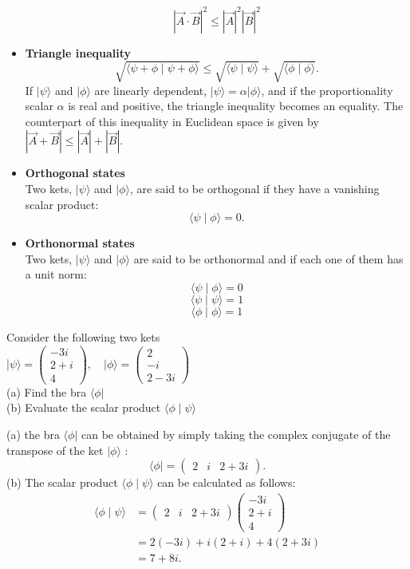 \begin{itemize}
$$
|\vec{A} \cdot \vec{B}|^{2} \leq|\vec{A}|^{2}|\vec{B}|^{2}
$$
\item \textbf{Triangle inequality}\\
$$
\sqrt{\langle\psi+\phi \mid \psi+\phi\rangle} \leq \sqrt{\langle\psi \mid \psi\rangle}+\sqrt{\langle\phi \mid \phi\rangle} .
$$
If $|\psi\rangle$ and $|\phi\rangle$ are linearly dependent, $|\psi\rangle=\alpha|\phi\rangle$, and if the proportionality scalar $\alpha$ is real and positive, the triangle inequality becomes an equality. The counterpart of this inequality in Euclidean space is given by $|\vec{A}+\vec{B}| \leq|\vec{A}|+|\vec{B}|$.
\item \textbf{Orthogonal states}\\
Two kets, $|\psi\rangle$ and $|\phi\rangle$, are said to be orthogonal if they have a vanishing scalar product:
$$
\langle\psi \mid \phi\rangle=0 .
$$
\item \textbf{Orthonormal states}\\
Two kets, $|\psi\rangle $ and $|\phi \rangle $ are said to be orthonormal and if each one of them has a unit norm:\\
$$ \langle \psi \mid \phi \rangle =0$$ 
$$ \langle \psi \mid \psi \rangle =1$$ 
$$ \langle \phi \mid \phi \rangle =1$$ 
\end{itemize}
\begin{exercise}
	Consider the following two kets\\
	|$\psi\rangle=\left(\begin{array}{c}
		-3 i \\
		2+i \\
		4
	\end{array}\right), \quad|\phi\rangle=\left(\begin{array}{c}
		2 \\
		-i \\
		2-3 i
	\end{array}\right)$\\
	(a) Find the bra $\langle \phi |$ \\
	(b) Evaluate the scalar product $\langle \phi \mid \psi \rangle $
\end{exercise}
\begin{answer}
(a) the bra $\langle\phi|$ can be obtained by simply taking the complex conjugate of the transpose of the ket $|\phi\rangle$ :
	$$
	\langle\phi|=\left(\begin{array}{lll}
	2 & i & 2+3 i
	\end{array}\right) .
	$$
	(b) The scalar product $\langle\phi \mid \psi\rangle$ can be calculated as follows:
	$$
	\begin{aligned}
	\langle\phi \mid \psi\rangle &=\left(\begin{array}{lll}
	2 & i & 2+3 i
	\end{array}\right)\left(\begin{array}{c}
	-3 i \\
	2+i \\
	4
	\end{array}\right) \\
	&=2(-3 i)+i(2+i)+4(2+3 i) \\
	&=7+8 i .
	\end{aligned}
	$$
\end{answer}

